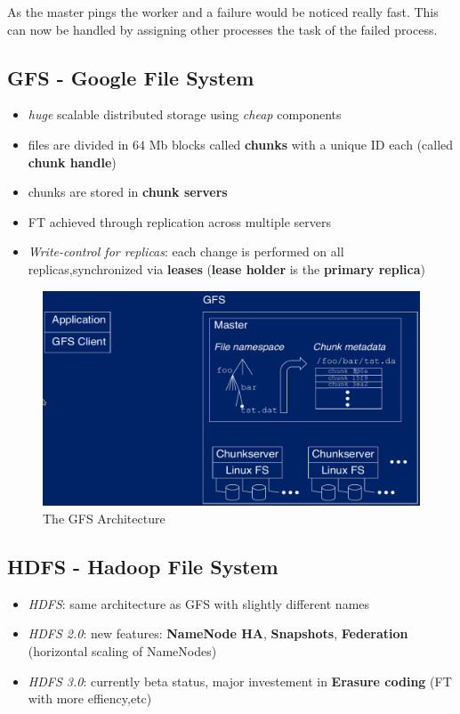 \documentclass[a4paper]{article}
\begin{document}
\begin{multicols}{3}
As the master pings the worker and a failure would be noticed really fast. This can now be handled by assigning other processes the task 
of the failed process.

\subsection{GFS - Google File System}
\begin{itemize}
    \item \textit{huge} scalable distributed storage using \textit{cheap} components
    \item files are divided in $64$ Mb blocks called \textbf{chunks} with a unique ID each (called \textbf{chunk handle})
    \item chunks are stored in \textbf{chunk servers}
    \item FT achieved through replication across multiple servers
    \item \textit{Write-control for replicas}: each change is performed on all replicas,synchronized via \textbf{leases} (\textbf{lease holder} is the \textbf{primary replica})
\end{itemize}

\begin{figure}[H]
    \includegraphics[width=\linewidth]{GFSArchitecture.png}
    \caption{The GFS Architecture}
    \label{fig:gfs}
\end{figure}

\subsection{HDFS - Hadoop File System}
\begin{itemize}
    \item \textit{HDFS}: same architecture as GFS with slightly different names
    \item \textit{HDFS 2.0}: new features: \textbf{NameNode HA}, \textbf{Snapshots}, \textbf{Federation} (horizontal scaling of NameNodes)
    \item \textit{HDFS 3.0}: currently beta status, major investement in \textbf{Erasure coding} (FT with more effiency,etc)
\end{itemize}


\end{multicols}
\end{document}
